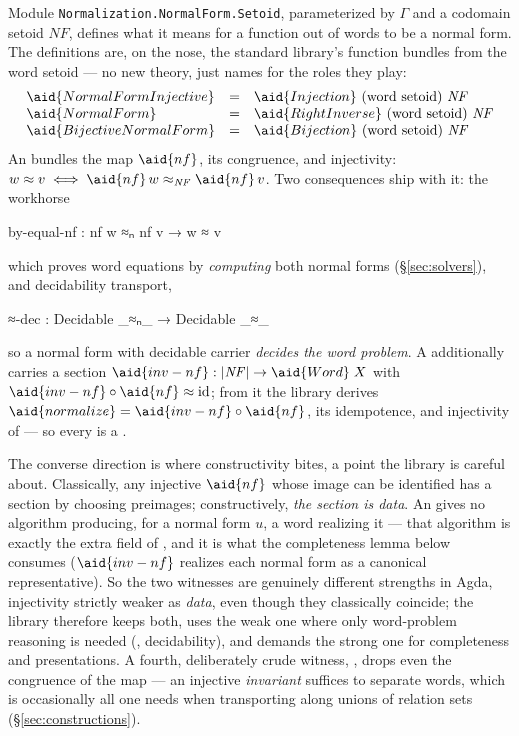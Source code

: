Module \texttt{Normalization.NormalForm.Setoid}, parameterized by $\Gamma$
and a codomain setoid $\mathit{NF}$, defines what it means for a function
out of words to be a normal form.  The definitions are, on the nose, the
standard library's function bundles from the word setoid --- no new
theory, just names for the roles they play:
\[
\begin{array}{lcl}
\aid{NormalFormInjective} & = & \aid{Injection}\ \text{(word setoid)}\ \mathit{NF} \\
\aid{NormalForm}          & = & \aid{RightInverse}\ \text{(word setoid)}\ \mathit{NF} \\
\aid{BijectiveNormalForm} & = & \aid{Bijection}\ \text{(word setoid)}\ \mathit{NF}
\end{array}
\]
An  bundles the map $\aid{nf}$, its congruence, and
injectivity: $w \approx v \iff \aid{nf}\,w \approx_{\mathit{NF}}
\aid{nf}\,v$.  Two consequences ship with it: the workhorse
\begin{agdacode}
by-equal-nf : nf w ≈ₙ nf v → w ≈ v
\end{agdacode}
which proves word equations by \emph{computing} both normal forms
(\S\ref{sec:solvers}), and decidability transport,
\begin{agdacode}
≈-dec : Decidable _≈ₙ_ → Decidable _≈_
\end{agdacode}
so a normal form with decidable carrier \emph{decides the word problem}.
A  additionally carries a section
$\aid{inv-nf} : |\mathit{NF}| \to \aid{Word}\;X$ with
$\aid{inv-nf} \circ \aid{nf} \approx \mathrm{id}$; from it the library
derives $\aid{normalize} = \aid{inv-nf} \circ \aid{nf}$, its idempotence,
and injectivity of  --- so every  is a
.

The converse direction is where constructivity bites, a point the library
is careful about.  Classically, any injective $\aid{nf}$ whose image can
be identified has a section by choosing preimages; constructively,
\emph{the section is data}.  An  gives no algorithm
producing, for a normal form $u$, a word realizing it --- that algorithm
is exactly the extra field of , and it is what the
completeness lemma below consumes ($\aid{inv-nf}$ realizes each normal
form as a canonical representative).  So the two witnesses are genuinely
different strengths in Agda, injectivity strictly weaker as \emph{data},
even though they classically coincide; the library therefore keeps both,
uses the weak one where only word-problem reasoning is needed
(, decidability), and demands the strong one for
completeness and presentations.  A fourth, deliberately crude witness,
, drops even the congruence of the map ---
an injective \emph{invariant} suffices to separate words, which is
occasionally all one needs when transporting along unions of relation
sets (\S\ref{sec:constructions}).

